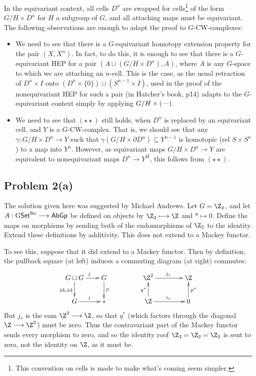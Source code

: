 \documentclass[11pt]{article}
\begin{document}
In the equivariant context, all cells $D^n$ are swapped for cells\footnote{This convention on cells is made to make what's coming seem simpler.} of the form $G/H\times D^n$ for $H$ a subgroup of $G$, and all attaching maps must be equivariant. The following observations are enough to adapt the proof to $G$-CW-complexes:
\begin{itemize}\squishlist
\item We need to see that there is a $G$-equivariant homotopy extension property for the pair $(X,X^n)$. In fact, to do this, it is enough to see that there is a $G$-equivariant HEP for a pair $(A\cup (G/H\times D^n),A)$, where $A$ is any $G$-space to which we are attaching an $n$-cell. This is the case, as the usual retraction of $D^n\times I$ onto $(D^n\times\{0\})\cup(S^{n-1}\times I)$, used in the proof of the nonequivariant HEP for such a pair (in Hatcher's book, p\. 14) adapts to the $G$-equivariant context simply by applying $G/H\times(\textup{---})$.
\item We need to see that $(\star\star)$ still holds, when $D^n$ is replaced by an equivariant cell, and $Y$ is a $G$-CW-complex. That is, we should see that any $\gamma:G/H\times D^n\to Y$ such that $\gamma(G/H\times\partial D^n)\subseteq Y^{n-1}$ is homotopic (rel $S\times S^n$) to a map into $Y^n$. However, as equivariant maps $G/H\times D^n\to Y$ are equivalent to nonequivariant maps $D^n\to Y^H$, this follows from $(\star\star)$.
\end{itemize}
\subsection*{Problem 2(a)}
The solution given here was suggested by Michael Andrews. Let $G=\Z_2$, and let $A:\operatorname{{G\mathsf{Set}^\textup{fin}}}\longrightarrow \operatorname{{\mathsf{AbGp}}}$ be defined on objects by $\Z_2\mapsto\Z$ and $*\mapsto0$. Define the maps on morphisms by sending both of the endomorphisms of $\Z_2$ to the identity. Extend these definitions by additivity. This does not extend to a Mackey functor.

To see this, suppose that it did extend to a Mackey functor. Then by definition, the pullback square (at left) induces a commuting diagram (at right) commutes:
\[\xymatrix@!0@R=12mm@C=1.5cm{
\ar[d]_{\id\sqcup\id}G\sqcup G\ar[r]^j&G\ar[d]^p\\
G\ar[r]^i&\ast
}\qquad\qquad\xymatrix@!0@R=12mm@C=2.05cm{
\ar[d];[]^{q^*}\Z^2\ar[r]^{j_*}&\Z\ar[d];[]_{p^*}\\
\Z\ar[r]^{i_*}&0
}\]
But $j_*$ is the sum $\Z^2\to\Z$, so that $q^*$ (which factors through the diagonal $\Z\to\Z^2$) must be zero. Thus the contravariant part of the Mackey functor sends every morphism to zero, and so the identity roof $\Z_2=\Z_2=\Z_2$ is sent to zero, not the identity on $\Z$, as it must be.
\end{document}
